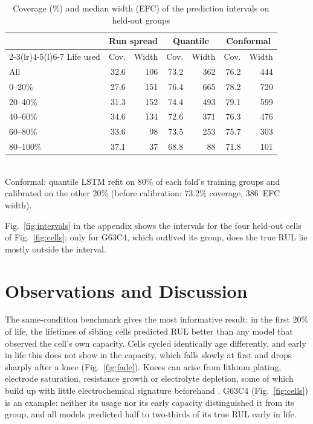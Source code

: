 \documentclass[conference]{IEEEtran}
\begin{document}
\begin{table}[t]
\centering
\caption{Coverage (\%) and median width (EFC) of the prediction intervals on held-out groups}
\label{tab:intervals}
\setlength{\tabcolsep}{3pt}
\begin{tabular}{@{}lrrrrrr@{}}
\toprule
 & \multicolumn{2}{c}{Run spread} & \multicolumn{2}{c}{Quantile} & \multicolumn{2}{c}{Conformal} \\
\cmidrule(lr){2-3}\cmidrule(lr){4-5}\cmidrule(l){6-7}
Life used & Cov. & Width & Cov. & Width & Cov. & Width \\
\midrule
All & 32.6 & 106 & 73.2 & 362 & 76.2 & 444 \\
0--20\% & 27.6 & 151 & 76.4 & 665 & 78.2 & 720 \\
20--40\% & 31.3 & 152 & 74.4 & 493 & 79.1 & 599 \\
40--60\% & 34.6 & 134 & 72.6 & 371 & 76.3 & 476 \\
60--80\% & 33.6 & 98 & 73.5 & 253 & 75.7 & 303 \\
80--100\% & 37.1 & 37 & 68.8 & 88 & 71.8 & 101 \\
\bottomrule
\end{tabular}
\\[2pt]
\footnotesize Conformal: quantile LSTM refit on 80\% of each fold's training groups and calibrated on the other 20\% (before calibration: 73.2\% coverage, 386~EFC width).
\end{table}

Fig.~\ref{fig:intervals} in the appendix shows the intervals for the four held-out cells of Fig.~\ref{fig:cells}; only for G63C4, which outlived its group, does the true RUL lie mostly outside the interval.


\section{Observations and Discussion}
The same-condition benchmark gives the most informative result: in the first 20\% of life, the lifetimes of sibling cells predicted RUL better than any model that observed the cell's own capacity. Cells cycled identically age differently, and early in life this does not show in the capacity, which falls slowly at first and drops sharply after a knee (Fig.~\ref{fig:fade}). Knees can arise from lithium plating, electrode saturation, resistance growth or electrolyte depletion, some of which build up with little electrochemical signature beforehand \cite{attia2022}. G63C4 (Fig.~\ref{fig:cells}) is an example: neither its usage nor its early capacity distinguished it from its group, and all models predicted half to two-thirds of its true RUL early in life.
\end{document}
